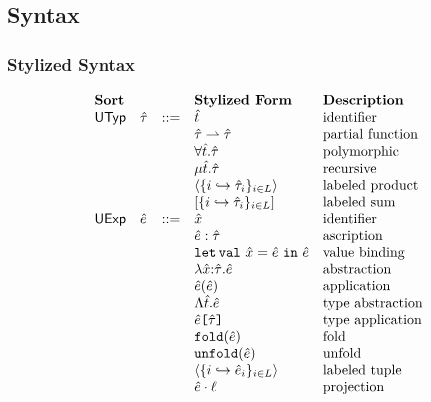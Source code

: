 \subsection{Syntax}\label{appendix:SES-syntax}\label{appendix:SES-shared-forms}
\subsubsection{Stylized Syntax}
\[\begin{array}{lllllll}
\textbf{Sort} & &  
& \textbf{Stylized Form} & \textbf{Description}\\
\mathsf{UTyp} & \utau & ::= 
& \ut & \text{identifier}\\
&& 
& \parr{\utau}{\utau} & \text{partial function}\\
&&
& \forallt{\ut}{\utau} & \text{polymorphic}\\
&&
& \rect{\ut}{\utau} & \text{recursive}\\
&&
& \prodt{\mapschema{\utau}{i}{\labelset}} & \text{labeled product}\\
&&
& \sumt{\mapschema{\utau}{i}{\labelset}} & \text{labeled sum}\\
\mathsf{UExp} & \ue & ::= 
& \ux & \text{identifier}\\
&&
%
& \asc{\ue}{\utau} & \text{ascription}\\
&&
%
& \letsyn{\ux}{\ue}{\ue} & \text{value binding}\\
&&
& \lam{\ux}{\utau}{\ue} & \text{abstraction}\\
&&
& \ap{\ue}{\ue} & \text{application}\\
&&
& \Lam{\ut}{\ue} & \text{type abstraction}\\
&&
& \App{\ue}{\utau} & \text{type application}\\
&&
& \fold{\ue} & \text{fold}\\
&&
& \unfold{\ue} & \text{unfold}\\
&&
& \tpl{\mapschema{\ue}{i}{\labelset}} & \text{labeled tuple}\\
&&
& \prj{\ue}{\ell} & \text{projection}\\
&&

\end{array}\]
